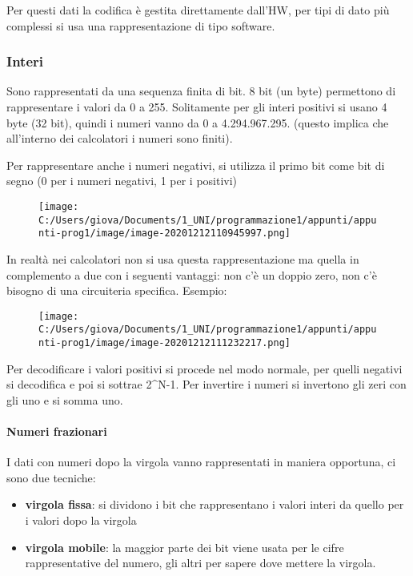 \documentclass[
]{article}
\begin{document}
Per questi dati la codifica è gestita direttamente dall'HW, per tipi di
dato più complessi si usa una rappresentazione di tipo software.

\hypertarget{header-n494}{%
\subsubsection{\texorpdfstring{Interi }{Interi }}\label{header-n494}}

Sono rappresentati da una sequenza finita di bit. 8 bit (un byte)
permettono di rappresentare i valori da 0 a 255. Solitamente per gli
interi positivi si usano 4 byte (32 bit), quindi i numeri vanno da 0 a
4.294.967.295. (questo implica che all'interno dei calcolatori i numeri
sono finiti).

Per rappresentare anche i numeri negativi, si utilizza il primo bit come
bit di segno (0 per i numeri negativi, 1 per i positivi)

\begin{figure}
\centering
\texttt{[image: C:/Users/giova/Documents/1\_UNI/programmazione1/appunti/appunti-prog1/image/image-20201212110945997.png]}
\caption{}
\end{figure}

In realtà nei calcolatori non si usa questa rappresentazione ma quella
in complemento a due con i seguenti vantaggi: non c'è un doppio zero,
non c'è bisogno di una circuiteria specifica. Esempio:

\begin{figure}
\centering
\texttt{[image: C:/Users/giova/Documents/1\_UNI/programmazione1/appunti/appunti-prog1/image/image-20201212111232217.png]}
\caption{}
\end{figure}

Per decodificare i valori positivi si procede nel modo normale, per
quelli negativi si decodifica e poi si sottrae 2\^{}N-1. Per invertire i
numeri si invertono gli zeri con gli uno e si somma uno.

\hypertarget{header-n501}{%
\paragraph{Numeri frazionari}\label{header-n501}}

I dati con numeri dopo la virgola vanno rappresentati in maniera
opportuna, ci sono due tecniche:

\begin{itemize}
\item
  \textbf{virgola fissa}: si dividono i bit che rappresentano i valori
  interi da quello per i valori dopo la virgola
\item
  \textbf{virgola mobile}: la maggior parte dei bit viene usata per le
  cifre rappresentative del numero, gli altri per sapere dove mettere la
  virgola.
\end{itemize}
\end{document}
